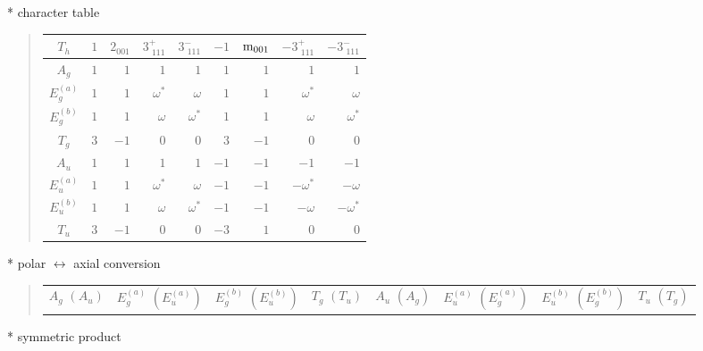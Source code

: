 \documentclass[fleqn,10pt,landscape]{jsarticle}
\begin{document}
* character table
\begin{quote}
\begin{tabular}{crrrrrrrr} \hline \hline
$ T_{h} $ & $ 1 $ & $ 2{}_{001} $ & $ 3^{+}_{\,\,111} $ & $ 3^{-}_{\,\,111} $ & $ -1 $ & $ {\rm m}_{001} $ & $ -3^{+}_{\,\,111} $ & $ -3^{-}_{\,\,111} $ \\ \hline
$ A_{g} $ & $ 1 $ & $ 1 $ & $ 1 $ & $ 1 $ & $ 1 $ & $ 1 $ & $ 1 $ & $ 1 $ \\
$ E_{g}^{(a)} $ & $ 1 $ & $ 1 $ & $ \omega^{*} $ & $ \omega $ & $ 1 $ & $ 1 $ & $ \omega^{*} $ & $ \omega $ \\
$ E_{g}^{(b)} $ & $ 1 $ & $ 1 $ & $ \omega $ & $ \omega^{*} $ & $ 1 $ & $ 1 $ & $ \omega $ & $ \omega^{*} $ \\
$ T_{g} $ & $ 3 $ & $ -1 $ & $ 0 $ & $ 0 $ & $ 3 $ & $ -1 $ & $ 0 $ & $ 0 $ \\
$ A_{u} $ & $ 1 $ & $ 1 $ & $ 1 $ & $ 1 $ & $ -1 $ & $ -1 $ & $ -1 $ & $ -1 $ \\
$ E_{u}^{(a)} $ & $ 1 $ & $ 1 $ & $ \omega^{*} $ & $ \omega $ & $ -1 $ & $ -1 $ & $ - \omega^{*} $ & $ - \omega $ \\
$ E_{u}^{(b)} $ & $ 1 $ & $ 1 $ & $ \omega $ & $ \omega^{*} $ & $ -1 $ & $ -1 $ & $ - \omega $ & $ - \omega^{*} $ \\
$ T_{u} $ & $ 3 $ & $ -1 $ & $ 0 $ & $ 0 $ & $ -3 $ & $ 1 $ & $ 0 $ & $ 0 $ \\
 \hline \hline
\end{tabular}
\end{quote}
* polar $\leftrightarrow$ axial conversion
\begin{quote}
\begin{tabular}{cccccccc}
$ A_{g}\,\,(A_{u}) $ & $ E_{g}^{(a)}\,\,(E_{u}^{(a)}) $ & $ E_{g}^{(b)}\,\,(E_{u}^{(b)}) $ & $ T_{g}\,\,(T_{u}) $ & $ A_{u}\,\,(A_{g}) $ & $ E_{u}^{(a)}\,\,(E_{g}^{(a)}) $ & $ E_{u}^{(b)}\,\,(E_{g}^{(b)}) $ & $ T_{u}\,\,(T_{g}) $
\end{tabular}
\end{quote}
* symmetric product
\end{document}
